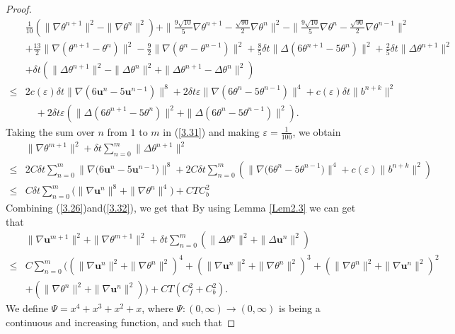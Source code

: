 \documentclass[10pt,a4paper]{amsart}
\theoremstyle{thmm}
\begin{document}
\begin{proof}
		\begin{align}\label{3.31}
			&\frac{1}{10}(\|\nabla\theta^{n+1}\|^2-\|\nabla\theta^{n}\|^2)+\|\frac{9\sqrt{10}}{5}\nabla\theta^{n+1}-\frac{\sqrt{90}}{2}\nabla\theta^{n}\|^2-\|\frac{9\sqrt{10}}{5}\nabla\theta^{n}-\frac{\sqrt{90}}{2}\nabla\theta^{n-1}\|^2\nonumber\\
			&  +\frac{13}{2}\|\nabla(\theta^{n+1}-\theta^n)\|^2-\frac{9}{2}\|\nabla(\theta^{n}-\theta^{n-1})\|^2+\frac{8}{5}\delta t\|\Delta(6\theta^{n+1}-5\theta^n)\|^2+\frac{2}{5}\delta t\|\Delta\theta^{n+1}\|^2\nonumber\\
			&  +\delta t(\|\Delta\theta^{n+1}\|^2-\|\Delta\theta^{n}\|^2+\|\Delta\theta^{n+1}-\Delta\theta^{n}\|^2)\nonumber\\
			\leq & { 2 c(\varepsilon) \delta t\|\nabla(6\bm{u}^{n}-5\bm{u}^{n-1})\|^8}+2\delta t \varepsilon\|\nabla(6\theta^{n}-5\theta^{n-1})\|^4+c(\varepsilon)\delta t\|b^{n+k}\|^2 \nonumber\\
			&\quad+2\delta t \varepsilon(\|\Delta(6\theta^{n+1}-5\theta^n)\|^2+\|\Delta(6\theta^{n} - 5\theta^{n-1})\|^2).
		\end{align}
		Taking the sum over \( n \) from \( 1 \) to \( m \) in (\ref{3.31}) and making \( \varepsilon = \frac{1}{100} \), we obtain
		{ 
		\begin{align}\label{3.32}
			& \|\nabla\theta^{m+1}\|^2+\delta t\sum_{n=0}^{m}\|\Delta\theta^{n+1}\|^2\nonumber\\
			 \leq& 2C\delta t \sum_{n=0}^{m}\big\|\nabla\big(6\bm{u}^{n}-5\bm{u}^{n-1}\big)\big\|^8
			+ 2C\delta t \sum_{n=0}^{m}(\big\|\nabla\big(6\theta^{n}-5\theta^{n-1}\big)\big\|^4
			+ c(\varepsilon)\|b^{n+k}\|^2)\nonumber \\
			 \leq& C\delta t\sum_{n=0}^{m}\big(\|\nabla\bm{u}^n\|^8+\|\nabla\theta^n\|^4\big) + CTC_b^2
		\end{align}}
		Combining (\ref{3.26})and(\ref{3.32}), we get that
		By using Lemma \ref{Lem2.3} we can get that
		{ 
		\begin{align}\label{3.33}
			&\|\nabla\bm{u}^{m+1}\|^2+\|\nabla\theta^{m+1}\|^2+\delta t\sum_{n=0}^{m}(\|\Delta\theta^{n}\|^2+\|\Delta\bm{u}^n\|^2)\nonumber\\
			\leq & C\sum_{n=0}^{m}((\|\nabla\bm{u}^n\|^2+\|\nabla\theta^{n}\|^2)^4+(\|\nabla\bm{u}^n\|^2+\|\nabla\theta^{n}\|^2)^3+(\|\nabla\theta^n\|^2+\|\nabla\bm{u}^n\|^2)^2\nonumber\\
			& +(\|\nabla\theta^n\|^2+\|\nabla\bm{u}^n\|^2))+CT(C_f^2+C_b^2).
		\end{align}}
	{ 
	We define \(\Psi = x^4 + x^3 + x^2+x \), where \(\Psi: (0, \infty) \to (0, \infty) \) is being a continuous and increasing function, and such that}

\end{proof}
\end{document}
